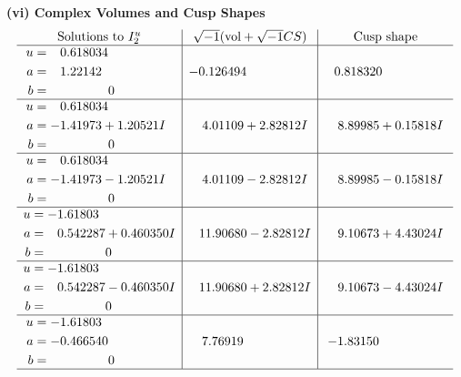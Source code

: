 \documentclass[1p]{elsarticle_modified}
\theoremstyle{definition}
\newcommand{\I}{\sqrt{-1}}
\begin{document}
\newpage\flushleft \textbf{(vi) Complex Volumes and Cusp Shapes}
$$\begin{array}{c|c|c}  
\text{Solutions to }I^u_{2}& \I (\text{vol} + \sqrt{-1}CS) & \text{Cusp shape}\\
 \hline 
\begin{aligned}
u &= \phantom{-}0.618034\phantom{ +0.000000I} \\
a &= \phantom{-}1.22142\phantom{ +0.000000I} \\
b &= \phantom{-0.000000 } 0\end{aligned}
 & -0.126494\phantom{ +0.000000I} & \phantom{-}0.818320\phantom{ +0.000000I} \\ \hline\begin{aligned}
u &= \phantom{-}0.618034\phantom{ +0.000000I} \\
a &= -1.41973 + 1.20521 I \\
b &= \phantom{-0.000000 } 0\end{aligned}
 & \phantom{-}4.01109 + 2.82812 I & \phantom{-}8.89985 + 0.15818 I \\ \hline\begin{aligned}
u &= \phantom{-}0.618034\phantom{ +0.000000I} \\
a &= -1.41973 - 1.20521 I \\
b &= \phantom{-0.000000 } 0\end{aligned}
 & \phantom{-}4.01109 - 2.82812 I & \phantom{-}8.89985 - 0.15818 I \\ \hline\begin{aligned}
u &= -1.61803\phantom{ +0.000000I} \\
a &= \phantom{-}0.542287 + 0.460350 I \\
b &= \phantom{-0.000000 } 0\end{aligned}
 & \phantom{-}11.90680 - 2.82812 I & \phantom{-}9.10673 + 4.43024 I \\ \hline\begin{aligned}
u &= -1.61803\phantom{ +0.000000I} \\
a &= \phantom{-}0.542287 - 0.460350 I \\
b &= \phantom{-0.000000 } 0\end{aligned}
 & \phantom{-}11.90680 + 2.82812 I & \phantom{-}9.10673 - 4.43024 I \\ \hline\begin{aligned}
u &= -1.61803\phantom{ +0.000000I} \\
a &= -0.466540\phantom{ +0.000000I} \\
b &= \phantom{-0.000000 } 0\end{aligned}
 & \phantom{-}7.76919\phantom{ +0.000000I} & -1.83150\phantom{ +0.000000I}\\
 \hline 
 \end{array}$$\newpage
\end{document}
